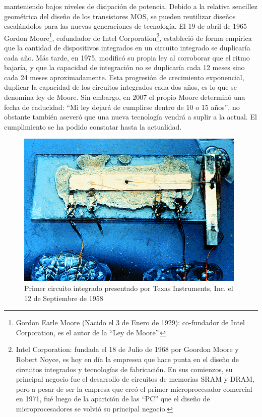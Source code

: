 manteniendo bajos niveles de disipación de potencia. Debido a la relativa
sencillez geométrica del diseño de los transistores MOS, se pueden reutilizar
diseños escalándolos para las nuevas generaciones de tecnología. El 19 de abril
de 1965 Gordon Moore\footnote{Gordon Earle Moore (Nacido el 3 de Enero de 1929):
co-fundador de Intel Corporation, es el autor de la ``Ley de Moore''.},
cofundador de Intel Corporation\footnote{Intel Corporation: fundada el 18 de
Julio de 1968 por Goordon Moore y Robert Noyce, es hoy en día la empresea que
hace punta en el diseño de circuitos integrados y tecnologías de fabricación.
En sus comienzos, su principal negocio fue el desarrollo de circuitos de
memorias SRAM y DRAM, pero a pesar de ser la empresa que creó el primer
microprocesador comercial en 1971, fué luego de la aparición de las ``PC'' que
el diseño de microprocesadores se volvió su principal negocio.}, estableció de
forma empírica que la cantidad de dispositivos integrados en un circuito
integrado se duplicaría cada año. Más tarde, en 1975, modificó su propia ley al
corroborar que el ritmo bajaría, y que la capacidad de integración no se
duplicaría cada 12 meses sino cada 24 meses aproximadamente. Esta progresión de
crecimiento exponencial, duplicar la capacidad de los circuitos integrados cada
dos años, es lo que se denomina ley de Moore. Sin embargo, en 2007 el propio
Moore determinó una fecha de caducidad: ``Mi ley dejará de cumplirse dentro de
10 o 15 años'', no obstante también aseveró que una nueva tecnología vendrá a
suplir a la actual. El cumplimiento se ha podido constatar hasta la actualidad.

\begin{figure}
  \centering
  \includegraphics[scale=0.5]{./figures/C02-primer_circuito_integrado}
  \captionsetup{justification=centering}
  \caption{Primer circuito integrado presentado por Texas Instruments, Inc. el 
    12 de Septiembre de 1958}
  \label{fig:C02-primer_circuito_integrado}
\end{figure}

